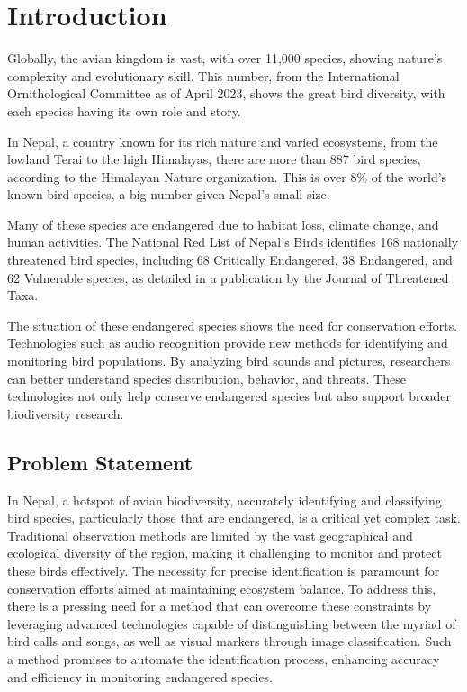 \chapter{Introduction}\label{sec}
Globally, the avian kingdom is vast, with over 11,000 species, showing nature's
complexity and evolutionary skill. This number, from the International
Ornithological Committee as of April 2023, shows the great bird diversity, with
each species having its own role and story.\cite{ioc_updates}

In Nepal, a country known for its rich nature and varied ecosystems, from the
lowland Terai to the high Himalayas, there are more than 887 bird species,
according to the Himalayan Nature organization. This is over 8\% of the world's
known bird species, a big number given Nepal's small size.\cite{himalayan}

Many of these species are endangered due to habitat loss, climate change, and
human activities. The National Red List of Nepal's Birds identifies 168
nationally threatened bird species, including 68 Critically Endangered, 38
Endangered, and 62 Vulnerable species, as detailed in a publication by the
Journal of Threatened Taxa.\cite{inskipp2017nepala}

The situation of these endangered species shows the need for conservation
efforts. Technologies such as audio recognition provide new methods for
identifying and monitoring bird populations. By analyzing bird sounds and
pictures, researchers can better understand species distribution, behavior, and
threats. These technologies not only help conserve endangered species but also
support broader biodiversity research.

\section{Problem Statement}
In Nepal, a hotspot of avian biodiversity, accurately identifying and
classifying bird species, particularly those that are endangered, is a critical
yet complex task. Traditional observation methods are limited by the vast
geographical and ecological diversity of the region, making it challenging to
monitor and protect these birds effectively. The necessity for precise
identification is paramount for conservation efforts aimed at maintaining
ecosystem balance. To address this, there is a pressing need for a method that
can overcome these constraints by leveraging advanced technologies capable of
distinguishing between the myriad of bird calls and songs, as well as visual
markers through image classification. Such a method promises to automate the
identification process, enhancing accuracy and efficiency in monitoring
endangered species.


